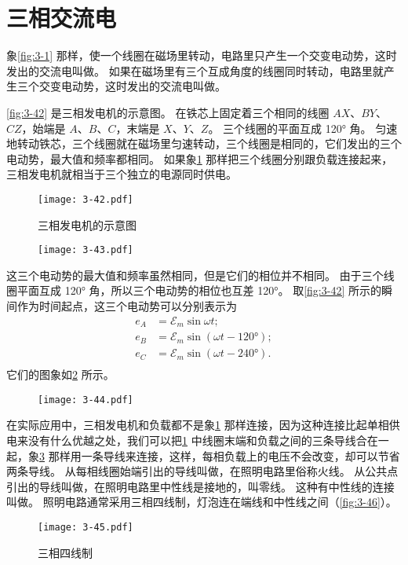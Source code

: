 \section{三相交流电}
象\cref{fig:3-1} 那样，使一个线圈在磁场里转动，电路里只产生一个交变电动势，这时发出的交流电叫做。
如果在磁场里有三个互成角度的线圈同时转动，电路里就产生三个交变电动势，这时发出的交流电叫做。

\cref{fig:3-42} 是三相发电机的示意图。
在铁芯上固定着三个相同的线圈 $AX$、$BY$、$CZ$，始端是 $A$、$B$、$C$，末端是 $X$、$Y$、$Z$。
三个线圈的平面互成 \ang{120} 角。
匀速地转动铁芯，三个线圈就在磁场里匀速转动，三个线圈是相同的，它们发出的三个电动势，最大值和频率都相同。
如果象\cref{fig:3-43} 那样把三个线圈分别跟负载连接起来，三相发电机就相当于三个独立的电源同时供电。
\begin{figure}
  \begin{minipage}[b]{0.48\linewidth}\centering
    \texttt{[image: 3-42.pdf]}
    \caption{三相发电机的示意图}\label{fig:3-42}
  \end{minipage}
  \begin{minipage}[b]{0.48\linewidth}\centering
    \texttt{[image: 3-43.pdf]}
    \caption{}\label{fig:3-43}
  \end{minipage}
\end{figure}

这三个电动势的最大值和频率虽然相同，但是它们的相位并不相同。
由于三个线圈平面互成 \ang{120} 角，所以三个电动势的相位也互差 \ang{120}。
取\cref{fig:3-42} 所示的瞬间作为时间起点，这三个电动势可以分别表示为
\[\begin{split}
e_A&=\mathcal{E}_m\sin \omega t;\\
e_B&=\mathcal{E}_m\sin (\omega t-\ang{120});\\
e_C&=\mathcal{E}_m\sin (\omega t-\ang{240}).\\
\end{split}\]
它们的图象如\cref{fig:3-44} 所示。
\begin{figure}
  \texttt{[image: 3-44.pdf]}
  \caption{}\label{fig:3-44}
\end{figure}

在实际应用中，三相发电机和负载都不是象\cref{fig:3-43} 那样连接，因为这种连接比起单相供电来没有什么优越之处，我们可以把\cref{fig:3-43} 中线圈末端和负载之间的三条导线合在一起，象\cref{fig:3-45} 那样用一条导线来连接，这样，每相负载上的电压不会改变，却可以节省两条导线。
从每相线圈始端引出的导线叫做，在照明电路里俗称火线。
从公共点引出的导线叫做，在照明电路里中性线是接地的，叫零线。
这种有中性线的连接叫做。
照明电路通常采用三相四线制，灯泡连在端线和中性线之间（\cref{fig:3-46}）。
\begin{figure}
  \texttt{[image: 3-45.pdf]}
  \caption{三相四线制}\label{fig:3-45}
\end{figure}

